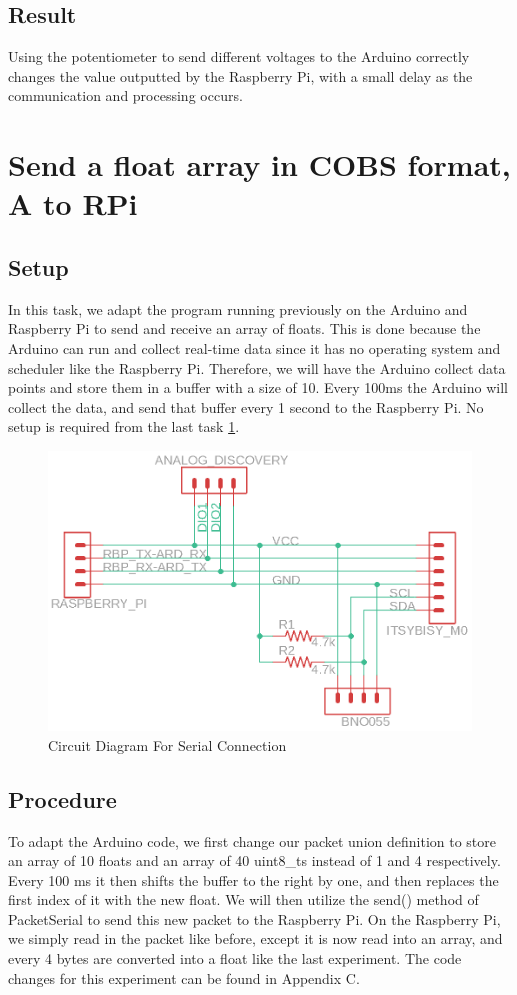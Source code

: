 \documentclass{article}
\begin{document}
	\subsection{Result}
	Using the potentiometer to send different voltages to the Arduino correctly changes the value outputted by the Raspberry Pi, with a small delay as the communication and processing occurs.
	
	\clearpage
	\section{Send a float array in COBS format, A to RPi}
	\subsection{Setup}
	In this task, we adapt the program running previously on the Arduino and Raspberry Pi to send and receive an array of floats. This is done because the Arduino can run and collect real-time data since it has no operating system and scheduler like the Raspberry Pi. Therefore, we will have the Arduino collect data points and store them in a buffer with a size of 10. Every 100ms the Arduino will collect the data, and send that buffer every 1 second to the Raspberry Pi. No setup is required from the last task \ref{CNN4}.
	\begin{figure}[hb]
		\includegraphics[width=\textwidth]{img/Lab3_SerialConnection.png}
		\caption{Circuit Diagram For Serial Connection} 
		\label{CNN4}
	\end{figure}
	\subsection{Procedure}
	To adapt the Arduino code, we first change our packet union definition to store an array of 10 floats and an array of 40 uint8\_ts instead of 1 and 4 respectively. Every 100 ms it then shifts the buffer to the right by one, and then replaces the first index of it with the new float. We will then utilize the send() method of PacketSerial to send this new packet to the Raspberry Pi. On the Raspberry Pi,  we simply read in the packet like before, except it is now read into an array, and every 4 bytes are converted into a float like the last experiment. The code changes for this experiment can be found in Appendix C.
	
\end{document}
